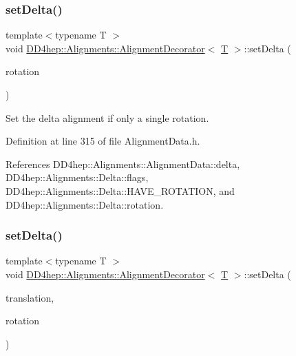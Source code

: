 \subsubsection{\texorpdfstring{set\+Delta()}{setDelta()}\hspace{0.1cm}{\footnotesize\ttfamily [3/4]}}
{\footnotesize\ttfamily template$<$typename T $>$ \\
void \hyperlink{class_d_d4hep_1_1_alignments_1_1_alignment_decorator}{D\+D4hep\+::\+Alignments\+::\+Alignment\+Decorator}$<$ \hyperlink{class_t}{T} $>$\+::set\+Delta (\begin{DoxyParamCaption}\item[{const Rotation\+Z\+YX \&}]{rotation }\end{DoxyParamCaption})\hspace{0.3cm}{\ttfamily [inline]}}



Set the delta alignment if only a single rotation. 



Definition at line 315 of file Alignment\+Data.\+h.



References D\+D4hep\+::\+Alignments\+::\+Alignment\+Data\+::delta, D\+D4hep\+::\+Alignments\+::\+Delta\+::flags, D\+D4hep\+::\+Alignments\+::\+Delta\+::\+H\+A\+V\+E\+\_\+\+R\+O\+T\+A\+T\+I\+ON, and D\+D4hep\+::\+Alignments\+::\+Delta\+::rotation.

\hypertarget{class_d_d4hep_1_1_alignments_1_1_alignment_decorator_a123e789de1fa9b3c4cb0149d6831b287}{}\label{class_d_d4hep_1_1_alignments_1_1_alignment_decorator_a123e789de1fa9b3c4cb0149d6831b287} 
\subsubsection{\texorpdfstring{set\+Delta()}{setDelta()}\hspace{0.1cm}{\footnotesize\ttfamily [4/4]}}
{\footnotesize\ttfamily template$<$typename T $>$ \\
void \hyperlink{class_d_d4hep_1_1_alignments_1_1_alignment_decorator}{D\+D4hep\+::\+Alignments\+::\+Alignment\+Decorator}$<$ \hyperlink{class_t}{T} $>$\+::set\+Delta (\begin{DoxyParamCaption}\item[{const Position \&}]{translation,  }\item[{Rotation\+Z\+YX \&}]{rotation }\end{DoxyParamCaption})\hspace{0.3cm}{\ttfamily [inline]}}



